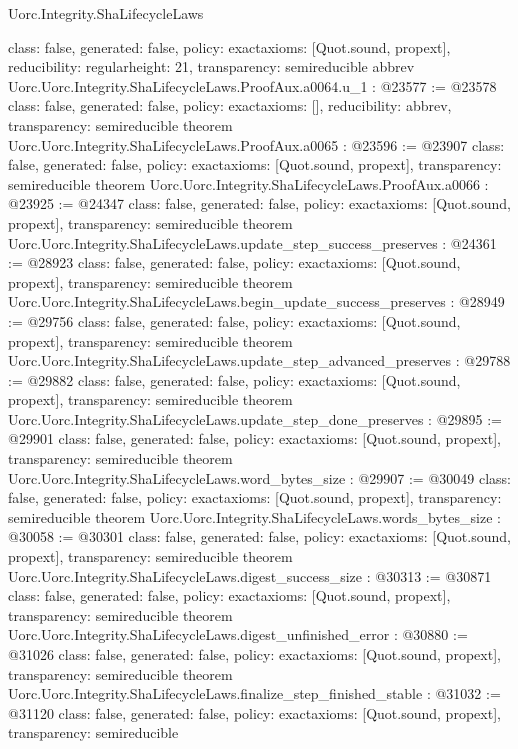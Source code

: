 \begin{lexlean}{Uorc.Integrity.ShaLifecycleLaws}
\begin{coremodule}
{  class: false,
  generated: false,
  policy: exact{axioms: [Quot.sound, propext]},
  reducibility: regular{height: 21},
  transparency: semireducible
}
abbrev Uorc.Uorc.Integrity.ShaLifecycleLaws.ProofAux.a0064.{u_1} : @23577 := @23578 {
  class: false,
  generated: false,
  policy: exact{axioms: []},
  reducibility: abbrev{},
  transparency: semireducible
}
theorem Uorc.Uorc.Integrity.ShaLifecycleLaws.ProofAux.a0065 : @23596 := @23907 {
  class: false,
  generated: false,
  policy: exact{axioms: [Quot.sound, propext]},
  transparency: semireducible
}
theorem Uorc.Uorc.Integrity.ShaLifecycleLaws.ProofAux.a0066 : @23925 := @24347 {
  class: false,
  generated: false,
  policy: exact{axioms: [Quot.sound, propext]},
  transparency: semireducible
}
theorem Uorc.Uorc.Integrity.ShaLifecycleLaws.update_step_success_preserves : @24361 := @28923 {
  class: false,
  generated: false,
  policy: exact{axioms: [Quot.sound, propext]},
  transparency: semireducible
}
theorem Uorc.Uorc.Integrity.ShaLifecycleLaws.begin_update_success_preserves : @28949 := @29756 {
  class: false,
  generated: false,
  policy: exact{axioms: [Quot.sound, propext]},
  transparency: semireducible
}
theorem Uorc.Uorc.Integrity.ShaLifecycleLaws.update_step_advanced_preserves : @29788 := @29882 {
  class: false,
  generated: false,
  policy: exact{axioms: [Quot.sound, propext]},
  transparency: semireducible
}
theorem Uorc.Uorc.Integrity.ShaLifecycleLaws.update_step_done_preserves : @29895 := @29901 {
  class: false,
  generated: false,
  policy: exact{axioms: [Quot.sound, propext]},
  transparency: semireducible
}
theorem Uorc.Uorc.Integrity.ShaLifecycleLaws.word_bytes_size : @29907 := @30049 {
  class: false,
  generated: false,
  policy: exact{axioms: [Quot.sound, propext]},
  transparency: semireducible
}
theorem Uorc.Uorc.Integrity.ShaLifecycleLaws.words_bytes_size : @30058 := @30301 {
  class: false,
  generated: false,
  policy: exact{axioms: [Quot.sound, propext]},
  transparency: semireducible
}
theorem Uorc.Uorc.Integrity.ShaLifecycleLaws.digest_success_size : @30313 := @30871 {
  class: false,
  generated: false,
  policy: exact{axioms: [Quot.sound, propext]},
  transparency: semireducible
}
theorem Uorc.Uorc.Integrity.ShaLifecycleLaws.digest_unfinished_error : @30880 := @31026 {
  class: false,
  generated: false,
  policy: exact{axioms: [Quot.sound, propext]},
  transparency: semireducible
}
theorem Uorc.Uorc.Integrity.ShaLifecycleLaws.finalize_step_finished_stable : @31032 := @31120 {
  class: false,
  generated: false,
  policy: exact{axioms: [Quot.sound, propext]},
  transparency: semireducible
}


\end{coremodule}
\end{lexlean}
